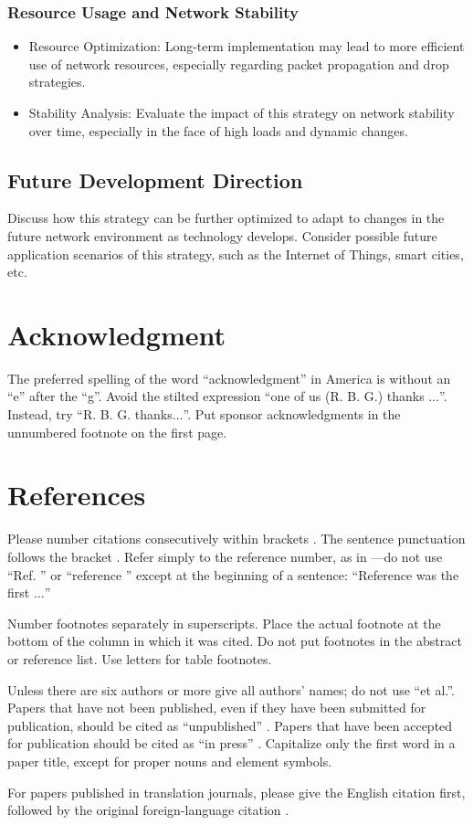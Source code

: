 \documentclass[conference]{IEEEtran}
\begin{document}
\subsubsection{Resource Usage and Network Stability}
\begin{itemize}
    \item Resource Optimization: Long-term implementation may lead to more efficient use of network resources, especially regarding packet propagation and drop strategies.
    \item Stability Analysis: Evaluate the impact of this strategy on network stability over time, especially in the face of high loads and dynamic changes.
\end{itemize}

\subsection{Future Development Direction}
Discuss how this strategy can be further optimized to adapt to changes in the future network environment as technology develops. Consider possible future application scenarios of this strategy, such as the Internet of Things, smart cities, etc.


\section*{Acknowledgment}

The preferred spelling of the word ``acknowledgment'' in America is without 
an ``e'' after the ``g''. Avoid the stilted expression ``one of us (R. B. 
G.) thanks $\ldots$''. Instead, try ``R. B. G. thanks$\ldots$''. Put sponsor 
acknowledgments in the unnumbered footnote on the first page.

\section*{References}

Please number citations consecutively within brackets \cite{b1}. The 
sentence punctuation follows the bracket \cite{b2}. Refer simply to the reference 
number, as in \cite{b3}---do not use ``Ref. \cite{b3}'' or ``reference \cite{b3}'' except at 
the beginning of a sentence: ``Reference \cite{b3} was the first $\ldots$''

Number footnotes separately in superscripts. Place the actual footnote at 
the bottom of the column in which it was cited. Do not put footnotes in the 
abstract or reference list. Use letters for table footnotes.

Unless there are six authors or more give all authors' names; do not use 
``et al.''. Papers that have not been published, even if they have been 
submitted for publication, should be cited as ``unpublished'' \cite{b4}. Papers 
that have been accepted for publication should be cited as ``in press'' \cite{b5}. 
Capitalize only the first word in a paper title, except for proper nouns and 
element symbols.

For papers published in translation journals, please give the English 
citation first, followed by the original foreign-language citation \cite{b6}.



\end{document}
